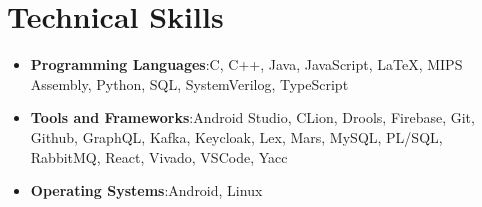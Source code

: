 \documentclass[a4paper,11pt]{article}
\newcommand{\resumeItem}[2]{
    \item{\textbf{#1}{:\hspace{0.5mm}#2 \vspace{-0.5mm}}}
}
\newcommand{\resumeSubItem}[2]{\resumeItem{#1}{#2}\vspace{-4pt}}
\newcommand{\resumeHeadingSkillStart}{\begin{itemize}[leftmargin=*,itemsep=1.7mm, rightmargin=2ex]}
\newcommand{\resumeHeadingSkillEnd}{\end{itemize}\vspace{-2mm}}
\begin{document}

\section{\textbf{Technical Skills}}
\vspace{1mm}
    \resumeHeadingSkillStart
        \resumeSubItem{Programming Languages}
            {C, C++, Java, JavaScript, LaTeX, MIPS Assembly, Python, SQL, SystemVerilog, TypeScript}
        \resumeSubItem{Tools and Frameworks}
            {Android Studio, CLion, Drools, Firebase, Git, Github, GraphQL, Kafka, Keycloak, Lex, Mars, MySQL, PL/SQL, RabbitMQ, React, Vivado, VSCode, Yacc}
        \resumeSubItem{Operating Systems}
            {Android, Linux}
    \resumeHeadingSkillEnd
\vspace{-1mm}

\end{document}
